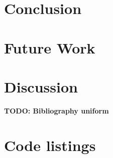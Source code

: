 \documentclass[12pt,a4paper,onecolumn,oneside,parskip]{memoir}
\newcommand{\todo}[1]{\textbf{TODO: #1}}
\begin{document}


\cleardoublepage

\begin{abstract}

\end{abstract}

\clearpage

\tableofcontents*

\clearpage















\chapter{Conclusion}

\chapter{Future Work}

\chapter{Discussion}
\label{chapter:discussion}

\todo{Bibliography uniform}




\appendix

\chapter{Code listings}

\end{document}
